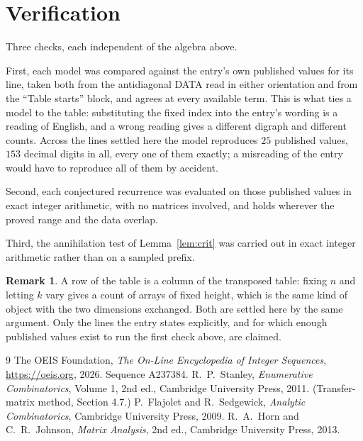 \documentclass[11pt,a4paper]{article}
\theoremstyle{plain}
\theoremstyle{definition}
\newtheorem{remark}[theorem]{Remark}
\begin{document}
\section{Verification}

Three checks, each independent of the algebra above.

First, each model was compared against the entry's own published values for its line, taken
both from the antidiagonal DATA read in either orientation and from the ``Table starts''
block, and agrees at every available term. This is what ties a model to the table:
substituting the fixed index into the entry's wording is a reading of English, and a wrong
reading gives a different digraph and different counts. Across the lines settled here the
model reproduces $25$ published values, $153$ decimal digits in all, every one of
them exactly; a misreading of the entry would have to reproduce all of them by accident.

Second, each conjectured recurrence was evaluated on those published values in exact
integer arithmetic, with no matrices involved, and holds wherever the proved range and the
data overlap.

Third, the annihilation test of Lemma~\ref{lem:crit} was carried out in exact integer
arithmetic rather than on a sampled prefix.

\begin{remark}
A row of the table is a column of the transposed table: fixing $n$ and letting $k$ vary gives a
count of arrays of fixed height, which is the same kind of object with the two dimensions
exchanged. Both are settled here by the same argument. Only the lines the entry states
explicitly, and for which enough published values exist to run the first check above, are
claimed.
\end{remark}

\begin{thebibliography}{9}
 The OEIS Foundation, \emph{The On-Line Encyclopedia of Integer
Sequences}, \url{https://oeis.org}, 2026. Sequence A237384.
 R.~P.~Stanley, \emph{Enumerative Combinatorics}, Volume 1, 2nd ed.,
Cambridge University Press, 2011. (Transfer-matrix method, Section 4.7.)
 P.~Flajolet and R.~Sedgewick, \emph{Analytic Combinatorics}, Cambridge
University Press, 2009.
 R.~A.~Horn and C.~R.~Johnson, \emph{Matrix Analysis}, 2nd ed., Cambridge
University Press, 2013.
\end{thebibliography}
\end{document}
